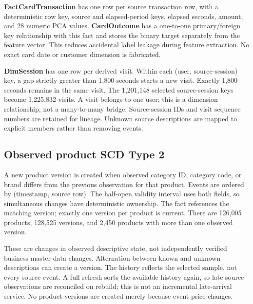 \documentclass[conference]{IEEEtran}
\begin{document}
\textbf{FactCardTransaction} has one row per source transaction row, with a deterministic row key, source and elapsed-period keys, elapsed seconds, amount, and 28 numeric PCA values. \textbf{CardOutcome} has a one-to-one primary/foreign key relationship with this fact and stores the binary target separately from the feature vector. This reduces accidental label leakage during feature extraction. No exact card date or customer dimension is fabricated.

\textbf{DimSession} has one row per derived visit. Within each (user, source-session) key, a gap strictly greater than 1,800 seconds starts a new visit. Exactly 1,800 seconds remains in the same visit. The 1,201,148 selected source-session keys become 1,225,832 visits. A visit belongs to one user; this is a dimension relationship, not a many-to-many bridge. Source-session IDs and visit sequence numbers are retained for lineage. Unknown source descriptions are mapped to explicit members rather than removing events.

\subsection{Observed product SCD Type 2}
A new product version is created when observed category ID, category code, or brand differs from the previous observation for that product. Events are ordered by (timestamp, source row). The half-open validity interval uses both fields, so simultaneous changes have deterministic ownership. The fact references the matching version; exactly one version per product is current. There are 126,005 products, 128,525 versions, and 2,450 products with more than one observed version.

These are changes in observed descriptive state, not independently verified business master-data changes. Alternation between known and unknown descriptions can create a version. The history reflects the selected sample, not every source event. A full refresh sorts the available history again, so late source observations are reconciled on rebuild; this is not an incremental late-arrival service. No product versions are created merely because event price changes.
\end{document}
